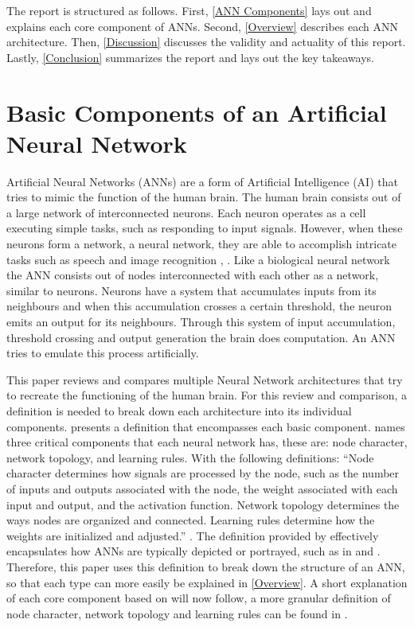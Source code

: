 \documentclass[conference]{IEEEtran}
\begin{document}
The report is structured as follows. First, \autoref{ANN Components} lays out and explains each core component of ANNs. Second, \autoref{Overview} describes each ANN architecture. Then, \autoref{Discussion} discusses the validity and actuality of this report. Lastly, \autoref{Conclusion} summarizes the report and lays out the key takeaways.

\section{Basic Components of an Artificial Neural Network} \label{ANN Components}
Artificial Neural Networks (ANNs) are a form of Artificial Intelligence (AI) that tries to mimic the function of the human brain. The human brain consists out of a large network of interconnected neurons. Each neuron operates as a cell executing simple tasks, such as responding to input signals. However, when these neurons form a network, a neural network, they are able to accomplish intricate tasks such as speech and image recognition \cite{zou2009overview}, \cite{abiodun2018state}. Like a biological neural network the ANN consists out of nodes interconnected with each other as a network, similar to neurons. Neurons have a system that accumulates inputs from its neighbours and when this accumulation crosses a certain threshold, the neuron emits an output for its neighbours. Through this system of input accumulation, threshold crossing and output generation the brain does computation. An ANN tries to emulate this process artificially.

This paper reviews and compares multiple Neural Network architectures that try to recreate the functioning of the human brain. For this review and comparison, a definition is needed to break down each architecture into its individual components. \cite{zou2009overview} presents a definition that encompasses each basic component. \cite{zou2009overview} names three critical components that each neural network has, these are:  node character, network topology, and learning rules. With the following definitions: ``Node character determines how signals are processed by the node, such as the number of inputs and outputs associated with the node, the weight associated with each input and output, and the activation function. Network topology determines the ways nodes are organized and connected. Learning rules determine how the weights are initialized and adjusted.'' \cite[p. 17]{zou2009overview}. The definition provided by \cite{zou2009overview} effectively encapsulates how ANNs are typically depicted or portrayed, such as in \cite{abiodun2018state} and \cite{Goodfellow-et-al-2016}. Therefore, this paper uses this definition to break down the structure of an ANN, so that each type can more easily be explained in \autoref{Overview}. A short explanation of each core component based on \cite{zou2009overview} will now follow, a more granular definition of node character, network topology and learning rules can be found in \cite{zou2009overview}.
\end{document}
